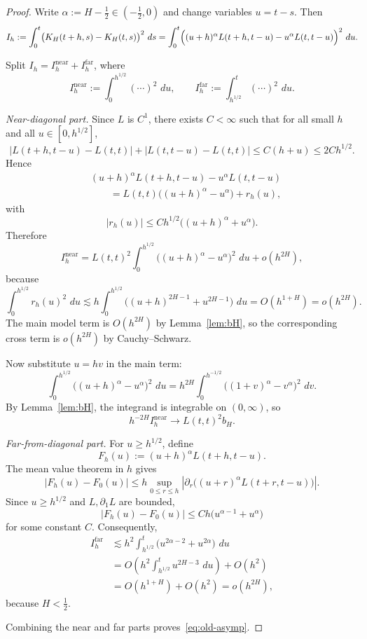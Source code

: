 \documentclass[11pt,a4paper]{amsart}
\theoremstyle{plain}
\theoremstyle{definition}
\theoremstyle{remark}
\newcommand{\dd}{\,d}
\begin{document}
\begin{proof}
Write $\alpha:=H-\tfrac12\in(-\tfrac12,0)$ and change variables $u=t-s$. Then
\[
I_h
:=
\int_0^t \bigl(K_H(t+h,s)-K_H(t,s)\bigr)^2\,\dd s
=
\int_0^t \Bigl((u+h)^\alpha L(t+h,t-u)-u^\alpha L(t,t-u)\Bigr)^2\,\dd u.
\]

Split $I_h=I_h^{\mathrm{near}}+I_h^{\mathrm{far}}$, where
\[
I_h^{\mathrm{near}}:=\int_0^{h^{1/2}} (\cdots)^2\,\dd u,
\qquad
I_h^{\mathrm{far}}:=\int_{h^{1/2}}^t (\cdots)^2\,\dd u.
\]

\emph{Near-diagonal part.}
Since $L$ is $C^1$, there exists $C<\infty$ such that for all small $h$ and all
$u\in[0,h^{1/2}]$,
\[
|L(t+h,t-u)-L(t,t)|+|L(t,t-u)-L(t,t)|\le C(h+u)\le 2C h^{1/2}.
\]
Hence
\begin{align*}
&(u+h)^\alpha L(t+h,t-u)-u^\alpha L(t,t-u) \\
&\qquad=
L(t,t)\bigl((u+h)^\alpha-u^\alpha\bigr)+r_h(u),
\end{align*}
with
\[
|r_h(u)|\le C h^{1/2}\bigl((u+h)^\alpha+u^\alpha\bigr).
\]
Therefore
\[
I_h^{\mathrm{near}}
=
L(t,t)^2 \int_0^{h^{1/2}} \bigl((u+h)^\alpha-u^\alpha\bigr)^2\,\dd u
+ o(h^{2H}),
\]
because
\[
\int_0^{h^{1/2}} r_h(u)^2\,\dd u
\lesssim
h\int_0^{h^{1/2}} \bigl((u+h)^{2H-1}+u^{2H-1}\bigr)\,\dd u
=
O(h^{1+H})
=
o(h^{2H}).
\]
The main model term is $O(h^{2H})$ by Lemma~\ref{lem:bH}, so the corresponding cross term is
$o(h^{2H})$ by Cauchy--Schwarz.

Now substitute $u=hv$ in the main term:
\[
\int_0^{h^{1/2}} \bigl((u+h)^\alpha-u^\alpha\bigr)^2\,\dd u
=
h^{2H}\int_0^{h^{-1/2}} \bigl((1+v)^\alpha-v^\alpha\bigr)^2\,\dd v.
\]
By Lemma~\ref{lem:bH}, the integrand is integrable on $(0,\infty)$, so
\[
h^{-2H}I_h^{\mathrm{near}}
\longrightarrow
L(t,t)^2 b_H.
\]

\emph{Far-from-diagonal part.}
For $u\ge h^{1/2}$, define
\[
F_h(u):=(u+h)^\alpha L(t+h,t-u).
\]
The mean value theorem in $h$ gives
\[
|F_h(u)-F_0(u)|
\le
h\sup_{0\le r\le h}
\left|
\partial_r\bigl((u+r)^\alpha L(t+r,t-u)\bigr)
\right|.
\]
Since $u\ge h^{1/2}$ and $L,\partial_1L$ are bounded,
\[
|F_h(u)-F_0(u)|
\le
Ch\bigl(u^{\alpha-1}+u^\alpha\bigr)
\]
for some constant $C$. Consequently,
\begin{align*}
I_h^{\mathrm{far}}
&\lesssim
h^2\int_{h^{1/2}}^t \bigl(u^{2\alpha-2}+u^{2\alpha}\bigr)\,\dd u \\
&=
O\!\left(h^2\int_{h^{1/2}}^t u^{2H-3}\,\dd u\right)+O(h^2) \\
&=
O(h^{1+H})+O(h^2)
=
o(h^{2H}),
\end{align*}
because $H<\tfrac12$.

Combining the near and far parts proves~\eqref{eq:old-asymp}.
\end{proof}
\end{document}
